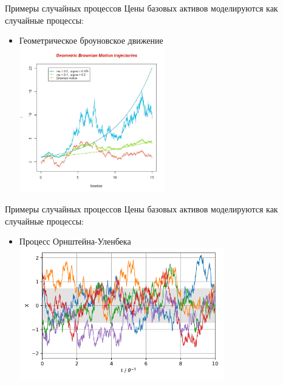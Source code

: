 \documentclass{beamer}
\begin{document}
        \begin{frame}{Примеры случайных процессов}
            Цены базовых активов моделируются как случайные процессы:
            \begin{itemize}
                \item Геометрическое броуновское движение\\
                \includegraphics[width=0.5\textwidth]{geometric_brownian_trajectories.jpg}
            \end{itemize}
        \end{frame}

        \begin{frame}{Примеры случайных процессов}
            Цены базовых активов моделируются как случайные процессы:
            \begin{itemize}
                \item Процесс Орнштейна-Уленбека\\
                \includegraphics[width=0.7\textwidth]{Ornstein-Uhlenbeck-5traces.svg.png}
            \end{itemize}
        \end{frame}
\end{document}
